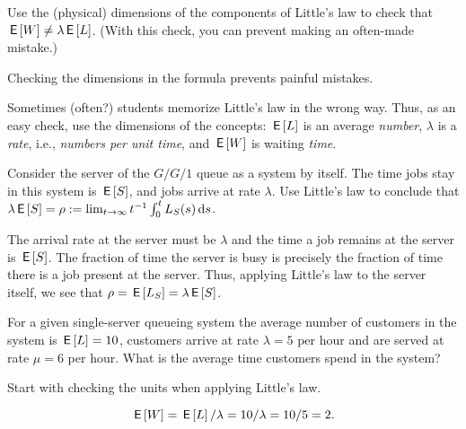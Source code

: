 \begin{extra}
  Use the (physical) dimensions of the components of Little's law to check that $\,\mathsf{E}\left[W\right] \neq \lambda \,\mathsf{E}\left[L\right]$.
  (With this check, you can prevent making an often-made mistake.)
\begin{hint}
Checking the dimensions in the formula prevents painful mistakes.
\end{hint}
\begin{solution}
 Sometimes (often?) students memorize Little's law in the wrong
 way. Thus, as an easy check, use the dimensions of the concepts:
 $\,\mathsf{E}\left[L\right]$ is an average \emph{number}, $\lambda$ is a \emph{rate},
 i.e., \emph{numbers per unit time}, and $\,\mathsf{E}\left[W\right]$ is waiting
 \emph{time}. 
\end{solution}
\end{extra}



\begin{extra}
 Consider the server of the $G/G/1$ queue as a system by itself.
 The time jobs stay in this system is $\,\mathsf{E}\left[S\right]$, and jobs arrive at rate $\lambda$.
 Use  Little's law to conclude that  $\lambda \,\mathsf{E}\left[S\right] = \rho := \lim_{t\to\infty} t^{-1}\int_0^t L_S(s)\,\text{d}s$.
\begin{solution}
 The arrival rate at the server must be $\lambda$ and the time a job remains at the server is $\,\mathsf{E}\left[S\right]$.
 The fraction of time the server is busy is precisely the fraction of time there is a job present at the server.
 Thus, applying Little's law to the server itself, we see that $\rho = \,\mathsf{E}\left[L_S\right] = \lambda \,\mathsf{E}\left[S\right]$.
\end{solution}
\end{extra}


\begin{extra}
 For a given single-server queueing system the average number of customers in the system is $\,\mathsf{E}\left[L\right] = 10$, customers arrive at rate $\lambda=5$ per hour and are served at rate $\mu=6$ per hour.
 What is the average time customers spend in the system?
\begin{hint}
Start with checking the units when applying Little's law.
\end{hint}
\begin{solution}
 \begin{equation*}
 \,\mathsf{E}\left[W\right] = \,\mathsf{E}\left[L\right]/\lambda = 10/\lambda = 10/5 = 2.
 \end{equation*}
\end{solution}
\end{extra}

